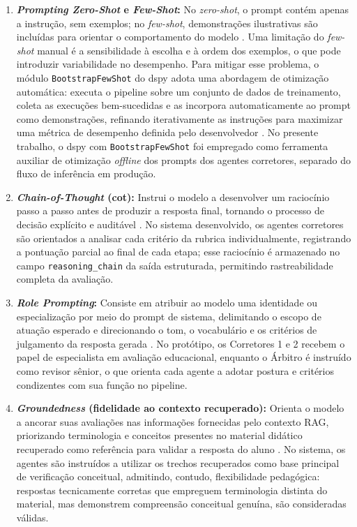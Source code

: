 \begin{enumerate}
    \item \textbf{\textit{Prompting Zero-Shot} e \textit{Few-Shot}:} No \textit{zero-shot}, o prompt contém apenas a instrução, sem exemplos; no \textit{few-shot}, demonstrações ilustrativas são incluídas para orientar o comportamento do modelo \cite{sahoo_systematic_2025}. Uma limitação do \textit{few-shot} manual é a sensibilidade à escolha e à ordem dos exemplos, o que pode introduzir variabilidade no desempenho. Para mitigar esse problema, o módulo \texttt{BootstrapFewShot} do \gls{dspy} adota uma abordagem de otimização automática: executa o pipeline sobre um conjunto de dados de treinamento, coleta as execuções bem-sucedidas e as incorpora automaticamente ao prompt como demonstrações, refinando iterativamente as instruções para maximizar uma métrica de desempenho definida pelo desenvolvedor \cite{dspy_docs_2026}. No presente trabalho, o \gls{dspy} com \texttt{BootstrapFewShot} foi empregado como ferramenta auxiliar de otimização \textit{offline} dos prompts dos agentes corretores, separado do fluxo de inferência em produção.

    \item \textbf{\textit{Chain-of-Thought} (\gls{cot}):} Instrui o modelo a desenvolver um raciocínio passo a passo antes de produzir a resposta final, tornando o processo de decisão explícito e auditável \cite{wei_chain--thought_2023}. No sistema desenvolvido, os agentes corretores são orientados a analisar cada critério da rubrica individualmente, registrando a pontuação parcial ao final de cada etapa; esse raciocínio é armazenado no campo \texttt{reasoning\_chain} da saída estruturada, permitindo rastreabilidade completa da avaliação.

    \item \textbf{\textit{Role Prompting}:} Consiste em atribuir ao modelo uma identidade ou especialização por meio do prompt de sistema, delimitando o escopo de atuação esperado e direcionando o tom, o vocabulário e os critérios de julgamento da resposta gerada \cite{sahoo_systematic_2025}. No protótipo, os Corretores 1 e 2 recebem o papel de especialista em avaliação educacional, enquanto o Árbitro é instruído como revisor sênior, o que orienta cada agente a adotar postura e critérios condizentes com sua função no pipeline.

    \item \textbf{\textit{Groundedness} (fidelidade ao contexto recuperado):} Orienta o modelo a ancorar suas avaliações nas informações fornecidas pelo contexto RAG, priorizando terminologia e conceitos presentes no material didático recuperado como referência para validar a resposta do aluno \cite{gao_retrieval-augmented_2024}. No sistema, os agentes são instruídos a utilizar os trechos recuperados como base principal de verificação conceitual, admitindo, contudo, flexibilidade pedagógica: respostas tecnicamente corretas que empreguem terminologia distinta do material, mas demonstrem compreensão conceitual genuína, são consideradas válidas.

\end{enumerate}

